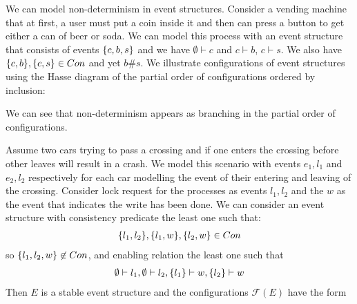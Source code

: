\documentclass{article}
\begin{document}
\begin{example}
    We can model non-determinism in event structures.
    Consider a vending machine that at first, a user must put a
    coin inside it and then can press a button to get either a can of beer or soda.
    We can model this process with an event structure that consists of events $\{c,b,s\}$ and we have
    $\emptyset \vdash c$ and $c \vdash b$, $c \vdash s$.
    We also have $\{c,b\},\{c,s\} \in Con$ and yet $b\#s$.
    We illustrate configurations of event structures using the Hasse diagram of
    the partial order of configurations ordered by inclusion:
    \begin{center}
    \end{center}
    We can see that non-determinism appears as branching in the partial order of configurations.
\end{example}

\begin{example}
    Assume two cars trying to pass a crossing and if one enters
    the crossing before other leaves will result in a crash.
    We model this scenario with events $e_1,l_1$ and $e_2,l_2$
    respectively for each car modelling the event of their entering and leaving of the crossing.
    Consider lock request for the processes as events $l_1,l_2$
    and the $w$ as the event that indicates the write has been done.
    We can consider an event structure
    with consistency predicate the least one such that:
    \begin{align*}
        \{l_1,l_2\},\{l_1,w\},\{l_2,w\} \in Con
    \end{align*}
    so $\{l_1,l_2,w\} \not \in Con$, and enabling relation the
    least one such that
    \begin{align*}
        \emptyset \vdash l_1, \emptyset \vdash l_2,
        \{l_1\} \vdash w, \{l_2\} \vdash w
    \end{align*}
    Then $E$ is a stable event structure and the configurations
    $\mathcal{F}(E)$ have the form
    \begin{center}
    \end{center}
\end{example}
\end{document}
